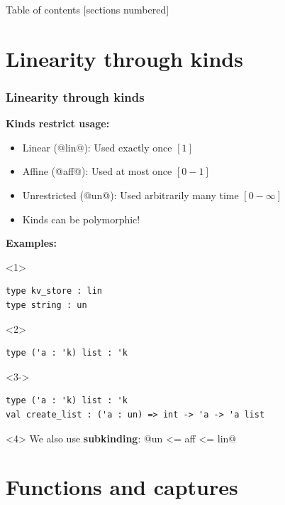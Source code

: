\documentclass[aspectratio=169,dvipsnames,svgnames,10pt]{beamer}
\begin{document}
\begin{frame}{Table of contents}
  [sections numbered]
  \tableofcontents[hideallsubsections]
\end{frame}

\section{Linearity through kinds}


\begin{frame}[fragile]
  \frametitle{Linearity through kinds}
  
  \textbf{Kinds restrict usage:}
  \begin{itemize}
  \item Linear (@lin@): Used exactly once $[1]$
  \item Affine (@aff@): Used at most once $[0-1]$
  \item Unrestricted (@un@): Used arbitrarily many time $[0-\infty]$
  \item<2-> Kinds can be polymorphic!
  \end{itemize}

  \textbf{Examples:}
  \begin{onlyenv}<1>
\begin{verbatim}
type kv_store : lin
type string : un
\end{verbatim}
  \end{onlyenv}
  \begin{onlyenv}<2>
\begin{verbatim}
type ('a : 'k) list : 'k
\end{verbatim}
  \end{onlyenv}
  \begin{onlyenv}<3->
\begin{verbatim}
type ('a : 'k) list : 'k
val create_list : ('a : un) => int -> 'a -> 'a list
\end{verbatim}
    
    \begin{onlyenv}<4>
      We also use \textbf{subkinding}: @un <= aff <= lin@
    \end{onlyenv}
  \end{onlyenv}
\end{frame}


\section{Functions and captures}
\end{document}
